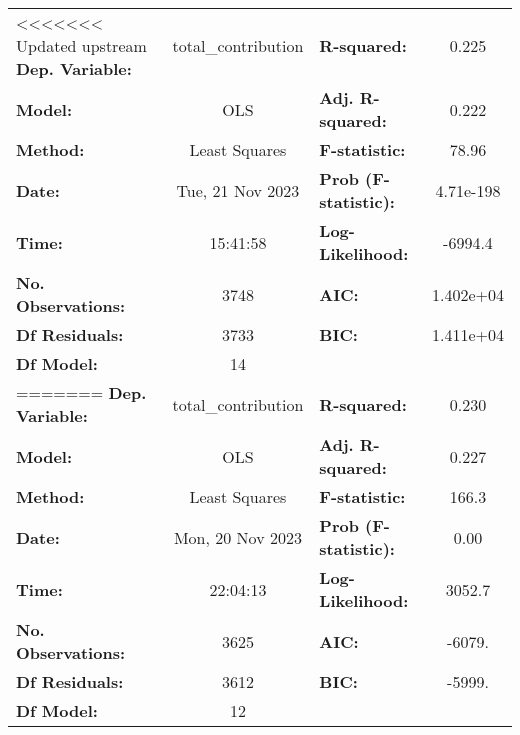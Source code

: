 \begin{center}
\begin{tabular}{lclc}
\toprule
<<<<<<< Updated upstream
\textbf{Dep. Variable:}                     & total\_contribution & \textbf{  R-squared:         } &     0.225   \\
\textbf{Model:}                             &         OLS         & \textbf{  Adj. R-squared:    } &     0.222   \\
\textbf{Method:}                            &    Least Squares    & \textbf{  F-statistic:       } &     78.96   \\
\textbf{Date:}                              &   Tue, 21 Nov 2023  & \textbf{  Prob (F-statistic):} & 4.71e-198   \\
\textbf{Time:}                              &       15:41:58      & \textbf{  Log-Likelihood:    } &   -6994.4   \\
\textbf{No. Observations:}                  &          3748       & \textbf{  AIC:               } & 1.402e+04   \\
\textbf{Df Residuals:}                      &          3733       & \textbf{  BIC:               } & 1.411e+04   \\
\textbf{Df Model:}                          &            14       & \textbf{                     } &             \\
=======
\textbf{Dep. Variable:}                     & total\_contribution & \textbf{  R-squared:         } &     0.230   \\
\textbf{Model:}                             &         OLS         & \textbf{  Adj. R-squared:    } &     0.227   \\
\textbf{Method:}                            &    Least Squares    & \textbf{  F-statistic:       } &     166.3   \\
\textbf{Date:}                              &   Mon, 20 Nov 2023  & \textbf{  Prob (F-statistic):} &     0.00    \\
\textbf{Time:}                              &       22:04:13      & \textbf{  Log-Likelihood:    } &    3052.7   \\
\textbf{No. Observations:}                  &          3625       & \textbf{  AIC:               } &    -6079.   \\
\textbf{Df Residuals:}                      &          3612       & \textbf{  BIC:               } &    -5999.   \\
\textbf{Df Model:}                          &            12       & \textbf{                     } &             \\

\end{tabular}
\end{center}
